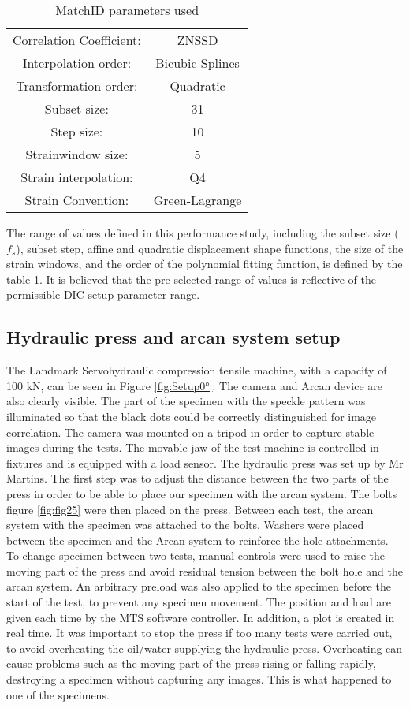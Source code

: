 \begin{table}[]
	\centering
	\begin{tabular}{c c}
		\hline
		Correlation   Coefficient: & ZNSSD \\ 
		Interpolation order: & Bicubic Splines \\ 
		Transformation order: & Quadratic \\
		Subset size: & 31 \\
		Step size: & 10 \\
		Strainwindow size: & 5 \\ 
		Strain interpolation: & Q4 \\ 
		Strain Convention: & Green-Lagrange \\ \hline
	\end{tabular}
	\caption{MatchID parameters used}
	\label{tab:MatchID_param}
\end{table}

The range of values defined in this performance study, including the subset size ($f_s$), subset step, affine and quadratic displacement shape functions, the size of the strain windows, and the order of the polynomial fitting function, is defined by the table \ref{tab:MatchID_param}. It is believed that the pre-selected range of values is reflective of the permissible DIC setup parameter range.

\subsection{Hydraulic press and arcan system setup}

The Landmark Servohydraulic compression tensile machine, with a capacity of 100 kN, can be seen in Figure \ref{fig:Setup0°}. The camera and Arcan device are also clearly visible. The part of the specimen with the speckle pattern was illuminated so that the black dots could be correctly distinguished for image correlation. The camera was mounted on a tripod in order to capture stable images during the tests. The movable jaw of the test machine is controlled in fixtures and is equipped with a load sensor.
The hydraulic press was set up by Mr Martins. The first step was to adjust the distance between the two parts of the press in order to be able to place our specimen with the arcan system. The bolts figure \ref{fig:fig25}  were then placed on the press. Between each test, the arcan system with the specimen was attached to the bolts. Washers were placed between the specimen and the Arcan system to reinforce the hole attachments. To change specimen between two tests, manual controls were used to raise the moving part of the press and avoid residual tension between the bolt hole and the arcan system. An arbitrary preload was also applied to the specimen before the start of the test, to prevent any specimen movement. The position and load are given each time by the MTS software controller. In addition, a plot is created in real time. It was important to stop the press if too many tests were carried out, to avoid overheating the oil/water supplying the hydraulic press. Overheating can cause problems such as the moving part of the press rising or falling rapidly, destroying a specimen without capturing any images. This is what happened to one of the specimens.

